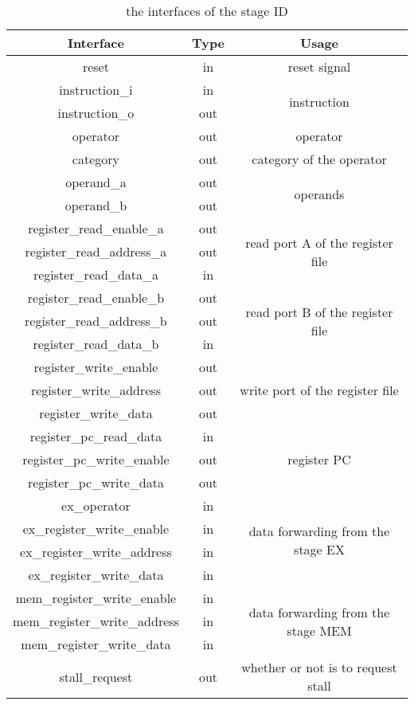 \begin{table}[!h]
\centering
\begin{tabular}{|c|c|c|}
\hline
Interface & Type & Usage \\ \hline
reset & in & reset signal \\ \hline
instruction\_i & in & \multirow{2}{*}{instruction} \\ \cline{1-2}
instruction\_o & out &  \\ \hline
operator & out & operator \\ \hline
category & out & category of the operator \\ \hline
operand\_a & out & \multirow{2}{*}{operands} \\ \cline{1-2}
operand\_b & out &  \\ \hline
register\_read\_enable\_a & out & \multirow{3}{*}{read port A of the register file} \\ \cline{1-2}
register\_read\_address\_a & out &  \\ \cline{1-2}
register\_read\_data\_a & in &  \\ \hline
register\_read\_enable\_b & out & \multirow{3}{*}{read port B of the register file} \\ \cline{1-2}
register\_read\_address\_b & out &  \\ \cline{1-2}
register\_read\_data\_b & in &  \\ \hline
register\_write\_enable & out & \multirow{3}{*}{write port of the register file} \\ \cline{1-2}
register\_write\_address & out &  \\ \cline{1-2}
register\_write\_data & out &  \\ \hline
register\_pc\_read\_data & in & \multirow{3}{*}{register PC} \\ \cline{1-2}
register\_pc\_write\_enable & out &  \\ \cline{1-2}
register\_pc\_write\_data & out &  \\ \hline
ex\_operator & in & \multirow{4}{*}{data forwarding from the stage EX} \\ \cline{1-2}
ex\_register\_write\_enable & in &  \\ \cline{1-2}
ex\_register\_write\_address & in &  \\ \cline{1-2}
ex\_register\_write\_data & in &  \\ \hline
mem\_register\_write\_enable & in & \multirow{3}{*}{data forwarding from the stage MEM} \\ \cline{1-2}
mem\_register\_write\_address & in &  \\ \cline{1-2}
mem\_register\_write\_data & in &  \\ \hline
stall\_request & out & whether or not is to request stall \\ \hline
\end{tabular}
\caption{the interfaces of the stage ID}
\end{table}
